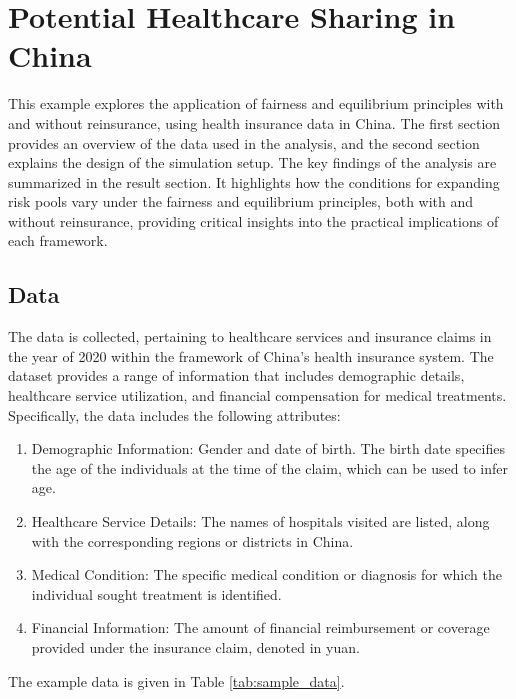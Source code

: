 \documentclass[fleqn,mnsc,nonblindrev]{informs4}
\begin{document}
\section{Potential Healthcare Sharing in China}\label{app:health}
This example explores the application of fairness and equilibrium principles with and without reinsurance, using health insurance data in China. The first section provides an overview of the data used in the analysis, and the second section explains the design of the simulation setup. The key findings of the analysis are summarized in the result section. It highlights how the conditions for expanding risk pools vary under the fairness and equilibrium principles, both with and without reinsurance, providing critical insights into the practical implications of each framework.

\subsection{Data}\label{app:health_data}
The data is collected, pertaining to healthcare services and insurance claims in the year of 2020 within the framework of China's health insurance system. The dataset provides a range of information that includes demographic details, healthcare service utilization, and financial compensation for medical treatments. Specifically, the data includes the following attributes:
\begin{enumerate}
\item Demographic Information: Gender and date of birth. The birth date specifies the age of the individuals at the time of the claim, which can be used to infer age.
\item Healthcare Service Details: The names of hospitals visited are listed, along with the corresponding regions or districts in China.
\item Medical Condition: The specific medical condition or diagnosis for which the individual sought treatment is identified.
\item Financial Information: The amount of financial reimbursement or coverage provided under the insurance claim, denoted in yuan.
\end{enumerate}
The example data is given in Table \ref{tab:sample_data}.
\begin{table}[t]
\centering
\caption{Sample Data}
\label{tab:sample_data}
\end{table}
\end{document}

